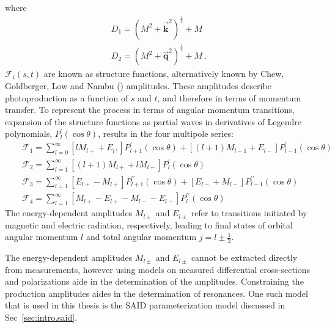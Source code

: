 where
\begin{align}
D_1 = (M^2 + \vec{\mathbf{k}}^2)^{\frac{1}{2}}+M \\
D_2 = (M^2 + \vec{\mathbf{q}}^2)^{\frac{1}{2}}+M \ .
\end{align}
$\mathcal{F}_i(s,t)$ are known as structure functions, alternatively known by Chew, Goldberger, Low and Nambu () amplitudes. These amplitudes describe photoproduction as a function of $s$ and $t$, and therefore in terms of momentum transfer. To represent the process in terms of angular momentum transitions, expansion of the structure functions as partial waves in derivatives of Legendre polynomials, $P_l^\prime(\cos\theta)$, results in the four multipole series:
\begin{align}
&&\mathcal{F_1} = \displaystyle\sum_{l=0}^{\infty}[lM_{l+} + E_{l^+}]P_{l+1}^{\prime}(\cos\theta) + [(l+1)M_{l-1} + E_{l-}]P_{l-1}^{\prime}(\cos\theta)\\
&&\mathcal{F_2} = \displaystyle\sum_{l=1}^{\infty}[(l+1)M_{l+}+lM_{l-}]P_{l}^{\prime}(\cos\theta)\\
&&\mathcal{F_3} = \displaystyle\sum_{l=1}^{\infty}[E_{l+}-M_{l+}]P_{l+1}^{\prime \prime}(\cos\theta) + [E_{l-} + M_{l-}]P_{l-1}^{\prime \prime}(\cos\theta)\\
&&\mathcal{F_4} = \displaystyle\sum_{l=1}^{\infty}[M_{l+} - E_{l+} - M_{l-} - E_{l-}]P_{l}^{\prime \prime}(\cos\theta)
\end{align}
The energy-dependent amplitudes $M_{l\pm}$ and $E_{l\pm}$ refer to transitions initiated by magnetic and electric radiation, respectively, leading to final states of orbital angular momentum $l$ and total angular momentum $j=l\pm\frac{1}{2}$. 

The energy-dependent amplitudes $M_{l\pm}$ and $E_{l\pm}$ cannot be extracted directly from measurements, however using models on measured differential cross-sections and polarizations aide in the determination of the amplitudes. Constraining the production amplitudes aides in the determination of resonances. One such model that is used in this thesis is the SAID parameterization model discussed in Sec~\ref{sec:intro.said}. 

